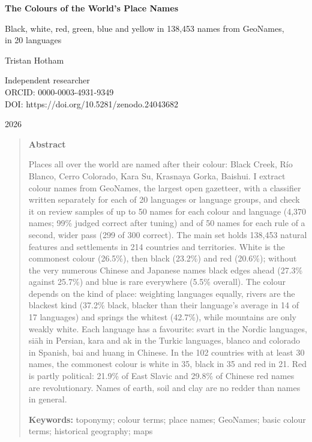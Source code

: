 \documentclass[11pt,a4paper]{article}
\begin{document}
\begin{center}
{\Large\bfseries The Colours of the World's Place Names\par}
\vspace{0.4em}
{\large Black, white, red, green, blue and yellow in 138,453 names from GeoNames,\\in 20 languages\par}
\vspace{1.2em}
{\large Tristan Hotham\par}
\vspace{0.3em}
{\small Independent researcher\\
ORCID: 0000-0003-4931-9349\\
DOI: https://doi.org/10.5281/zenodo.24043682\par}
\vspace{0.8em}
2026
\end{center}

\begin{quote}
\small
\begin{center}\textbf{Abstract}\end{center}
Places all over the world are named after their colour: Black Creek, Río Blanco, Cerro Colorado, Kara Su, Krasnaya Gorka, Baishui. I extract colour names from GeoNames, the largest open gazetteer, with a classifier written separately for each of 20 languages or language groups, and check it on review samples of up to 50 names for each colour and language (4,370 names; 99\% judged correct after tuning) and of 50 names for each rule of a second, wider pass (299 of 300 correct). The main set holds 138,453 natural features and settlements in 214 countries and territories. White is the commonest colour (26.5\%), then black (23.2\%) and red (20.6\%); without the very numerous Chinese and Japanese names black edges ahead (27.3\% against 25.7\%) and blue is rare everywhere (5.5\% overall). The colour depends on the kind of place: weighting languages equally, rivers are the blackest kind (37.2\% black, blacker than their language's average in 14 of 17 languages) and springs the whitest (42.7\%), while mountains are only weakly white. Each language has a favourite: svart in the Nordic languages, siāh in Persian, kara and ak in the Turkic languages, blanco and colorado in Spanish, bai and huang in Chinese. In the 102 countries with at least 30 names, the commonest colour is white in 35, black in 35 and red in 21. Red is partly political: 21.9\% of East Slavic and 29.8\% of Chinese red names are revolutionary. Names of earth, soil and clay are no redder than names in general.

\textbf{Keywords:} toponymy; colour terms; place names; GeoNames; basic colour terms; historical geography; maps
\end{quote}
\end{document}
